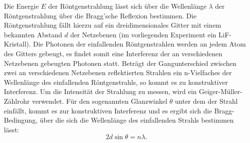 Die Energie $E$ der Röntgenstrahlung lässt sich über die Wellenlänge $\lambda$ der Röntgenstrahlung über die Bragg'sche Reflexion bestimmen.
Die Röntgenstrahlung fällt hierzu auf ein dreidimensionales Gitter mit einem bekannten Abstand $d$ der Netzebenen (im vorliegenden Experiment ein LiF-Kristall). Die Photonen der einfallenden Röntgenstrahlen werden an jedem Atom des Gitters gebeugt, es findet somit eine Interferenz der an verschiedenen Netzebenen gebeugten Photonen statt.
Beträgt der Gangunterschied zwischen zwei an verschiedenen Netzebenen reflektierten Strahlen ein n-Vielfaches der Wellenlänge des einfallenden Röntgenstrahls, so kommt es zu konstruktiver Interferenz.
Um die Intensität der Strahlung zu messen, wird ein Geiger-Müller-Zählrohr verwendet.
Für den sogenannten Glanzwinkel $\theta$ unter dem der Strahl einfällt, kommt es zur konstruktiven Interferenz und es ergibt sich die Bragg-Bedingung, über die sich die Wellenlänge des einfallenden Strahls bestimmen lässt:
\begin{equation}
	\label{eqn:braggii}
  2d \sin{\theta}=n\lambda \text{.}
\end{equation}
